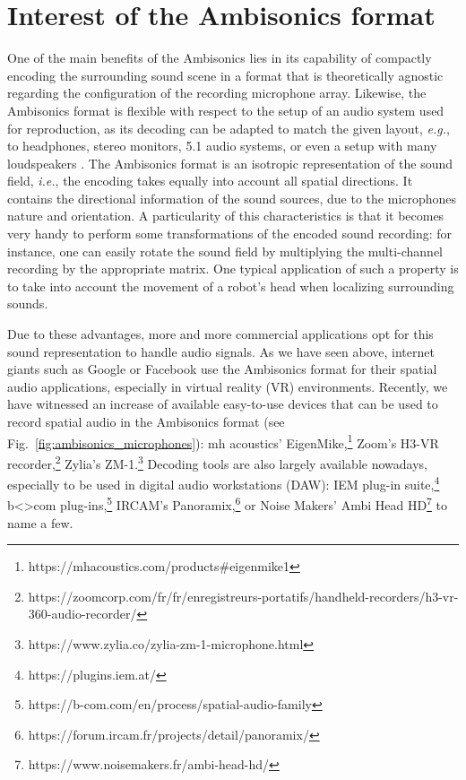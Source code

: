 \section{Interest of the Ambisonics format}

One of the main benefits of the Ambisonics lies in its capability of compactly encoding the surrounding sound scene in a format that is theoretically agnostic regarding the configuration of the recording microphone array. Likewise, the Ambisonics format is flexible with respect to the setup of an audio system used for reproduction, as its decoding can be adapted to match the given layout, \emph{e.g.}, to headphones, stereo monitors, 5.1 audio systems, or even a setup with many loudspeakers \cite{zotter_ambisonics_2019}. The Ambisonics format is an isotropic representation of the sound field, \emph{i.e.}, the encoding takes equally into account all spatial directions. It contains the directional information of the sound sources, due to the microphones nature and orientation. A particularity of this characteristics is that it becomes very handy to perform some transformations of the encoded sound recording: for instance, one can easily rotate the sound field by multiplying the multi-channel recording by the appropriate matrix. One typical application of such a property is to take into account the movement of a robot's head when localizing surrounding sounds.

Due to these advantages, more and more commercial applications opt for this sound representation to handle audio signals. As we have seen above, internet giants such as Google or Facebook use the Ambisonics format for their spatial audio applications, especially in virtual reality (VR) environments. Recently, we have witnessed an increase of available easy-to-use devices that can be used to record spatial audio in the Ambisonics format (see Fig.~\ref{fig:ambisonics_microphones}): mh acoustics' EigenMike,\footnote{https://mhacoustics.com/products\#eigenmike1} Zoom's H3-VR recorder,\footnote{https://zoomcorp.com/fr/fr/enregistreurs-portatifs/handheld-recorders/h3-vr-360-audio-recorder/} Zylia's ZM-1.\footnote{https://www.zylia.co/zylia-zm-1-microphone.html} Decoding tools are also largely available nowadays, especially to be used in digital audio workstations (DAW): IEM plug-in suite,\footnote{https://plugins.iem.at/} b<>com plug-ins,\footnote{https://b-com.com/en/process/spatial-audio-family} IRCAM's Panoramix,\footnote{https://forum.ircam.fr/projects/detail/panoramix/} or Noise Makers' Ambi Head HD\footnote{https://www.noisemakers.fr/ambi-head-hd/} to name a few.

